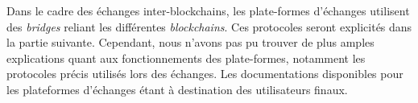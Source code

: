 Dans le cadre des échanges inter-\gls{blockchain}s, les plate-formes d'échanges utilisent des \textit{bridges} reliant les différentes \textit{\gls{blockchain}s}. 
Ces protocoles seront explicités dans la partie suivante.
Cependant, nous n'avons pas pu trouver de plus amples explications quant aux fonctionnements des plate-formes, notamment les protocoles précis utilisés lors des échanges. 
Les documentations disponibles pour les plateformes d'échanges étant à destination des utilisateurs finaux. 


